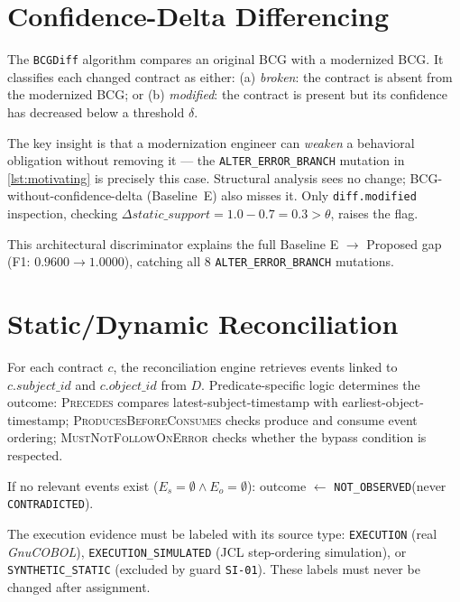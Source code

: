 \documentclass[sigconf,anonymous,review]{acmart}
\newcommand{\bcg}{\textsc{BCG}\xspace}
\newcommand{\gnucobol}{\textit{GnuCOBOL}\xspace}
\newcommand{\notobs}{\texttt{NOT\_OBSERVED}\xspace}
\begin{document}
\section{Confidence-Delta Differencing}\label{sec:diff}

The \texttt{BCGDiff} algorithm compares an original \bcg with a modernized \bcg.
It classifies each changed contract as either:
(a) \emph{broken}: the contract is absent from the modernized BCG; or
(b) \emph{modified}: the contract is present but its confidence has decreased
    below a threshold $\delta$.

The key insight is that a modernization engineer can \emph{weaken} a behavioral
obligation without removing it --- the \texttt{ALTER\_ERROR\_BRANCH} mutation in
\cref{lst:motivating} is precisely this case.
Structural analysis sees no change; BCG-without-confidence-delta (Baseline~E) also
misses it.
Only \texttt{diff.modified} inspection, checking
$\Delta\mathit{static\_support} = 1.0 - 0.7 = 0.3 > \theta$, raises the flag.

This architectural discriminator explains the full Baseline E $\to$ Proposed gap
(F1: $0.9600 \to 1.0000$), catching all 8 \texttt{ALTER\_ERROR\_BRANCH} mutations.

\section{Static/Dynamic Reconciliation}\label{sec:reconciliation}

For each contract $c$, the reconciliation engine retrieves events linked to
$c.\mathit{subject\_id}$ and $c.\mathit{object\_id}$ from $D$.
Predicate-specific logic determines the outcome:
\textsc{Precedes} compares latest-subject-timestamp with earliest-object-timestamp;
\textsc{ProducesBeforeConsumes} checks produce and consume event ordering;
\textsc{MustNotFollowOnError} checks whether the bypass condition is respected.

If no relevant events exist ($E_s = \emptyset \wedge E_o = \emptyset$):
outcome $\leftarrow$ \notobs (never \texttt{CONTRADICTED}).

The execution evidence must be labeled with its source type:
\texttt{EXECUTION} (real \gnucobol),
\texttt{EXECUTION\_SIMULATED} (JCL step-ordering simulation), or
\texttt{SYNTHETIC\_STATIC} (excluded by guard \texttt{SI-01}).
These labels must never be changed after assignment.
\end{document}
